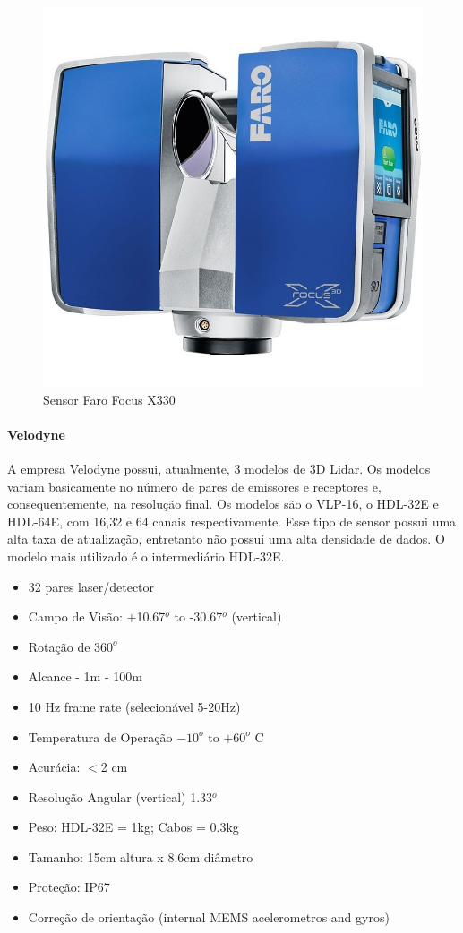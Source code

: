\begin{figure}[h!]
	\centering	
	\includegraphics[width=0.5\columnwidth]{detail/figs/3dsensors/faro}
	\caption{Sensor Faro Focus X330}
    \label{fig::faro_focus}
\end{figure}


\paragraph{Velodyne}

A empresa Velodyne possui, atualmente, 3 modelos de 3D Lidar. Os modelos variam
basicamente no número de pares de emissores e receptores e, consequentemente, na
resolução final. Os modelos são o VLP-16, o HDL-32E e HDL-64E, com 16,32 e 64
canais respectivamente. Esse tipo de sensor possui uma alta taxa de
atualização, entretanto não possui uma alta densidade de dados. O modelo mais
utilizado é o intermediário HDL-32E.

\begin{itemize}
\item 32 pares laser/detector  
\item Campo de Visão: +10.67$^o$ to -30.67$^o$ (vertical)
\item Rotação de $360^o$
\item Alcance - 1m - 100m 
\item 10 Hz frame rate (selecionável 5-20Hz)
\item Temperatura de Operação $-10^o$ to $+60^o$ C
\item Acurácia: $<$2 cm
\item Resolução Angular (vertical) 1.33$^o$
\item Peso: HDL-32E = 1kg; Cabos = 0.3kg
\item Tamanho: 15cm altura x 8.6cm diâmetro
\item Proteção: IP67
\item Correção de orientação (internal MEMS acelerometros and gyros)
\end{itemize}

